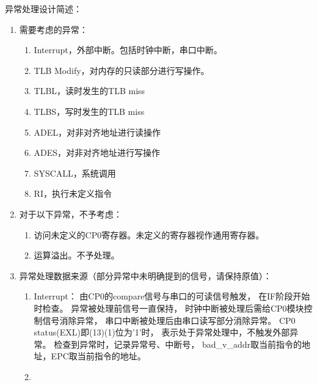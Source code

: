             异常处理设计简述：
            \begin{enumerate}
            \item
	        需要考虑的异常：
                \begin{enumerate}
                    \item
                    Interrupt，外部中断。包括时钟中断，串口中断。
                    \item
                    TLB Modify，对内存的只读部分进行写操作。
                    \item
                    TLBL，读时发生的TLB miss
                    \item
                    TLBS，写时发生的TLB miss
                    \item
                    ADEL，对非对齐地址进行读操作
                    \item
                    ADES，对非对齐地址进行写操作
                    \item
                    SYSCALL，系统调用
                    \item
                    RI，执行未定义指令
                \end{enumerate}
            \item
            对于以下异常，不予考虑：
                \begin{enumerate}
                    \item
                    访问未定义的CP0寄存器。未定义的寄存器视作通用寄存器。
                    \item
                    运算溢出。不予处理。
                \end{enumerate}
            \item
            异常处理数据来源（部分异常中未明确提到的信号，请保持原值）：
                \begin{enumerate}
                    \item
                    Interrupt：
                        由CP0的compare信号与串口的可读信号触发，%
                        在IF阶段开始时检查。
                        异常被处理前信号一直保持，%
                        时钟中断被处理后需给CP0模块控制信号消除异常，%
                        串口中断被处理后由串口读写部分消除异常。
                        CP0 status(EXL)即(13)(1)位为'1'时，%
                        表示处于异常处理中，不触发外部异常。
                        检查到异常时，记录异常号、中断号，%
                        bad\_v\_addr取当前指令的地址，EPC取当前指令的地址。
                    \item

\end{enumerate}
\end{enumerate}
